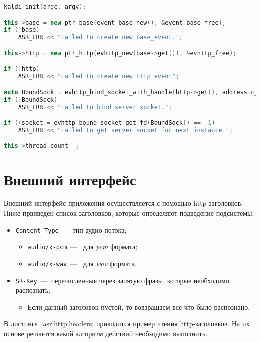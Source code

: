 \begin{lstlisting}[caption={Создание базовых объектов для инициализации подсистемы},label={asr:http:init},language=C++]
kaldi_init(argc, argv);

this->base = new ptr_base(event_base_new(), &event_base_free);
if (!base)
    ASR_ERR << "Failed to create new base_event.";

this->http = new ptr_http(evhttp_new(base->get()), &evhttp_free);

if (!http)
    ASR_ERR << "Failed to create new http event";

auto BoundSock = evhttp_bind_socket_with_handle(http->get(), address.c_str(), port);
if (!BoundSock)
    ASR_ERR << "Failed to bind server socket.";

if ((socket = evhttp_bound_socket_get_fd(BoundSock)) == -1)
    ASR_ERR << "Failed to get server socket for next instance.";

this->thread_count--;

\end{lstlisting}

\section{Внешний интерфейс}

Внешний интерфейс приложения осуществляется с помощью http-заголовков. Ниже
првиведён список заголовков, которые определяют подведение подсистемы:
\begin{itemize}
    \item \texttt{Content-Type}~---~тип аудио-потока;
    \begin{itemize}
        \item\texttt{audio/x-pcm}~---~ для \textit{pcm} формата;
        \item\texttt{audio/x-wav}~---~ для \textit{wav} формата.
    \end{itemize}
    \item \texttt{SR-Key}~---~перечисленные через запятую фразы, которые необходимо распознать;
    \begin{itemize}
        \item Если данный заголовок пустой, то вовзращаем всё что было распознано.
    \end{itemize}
\end{itemize}

В листинге~\ref{asr:http:headers} приводится пример чтения http-заголовков. На их
основе решается какой алгоритм действий необходимо выполнить.

